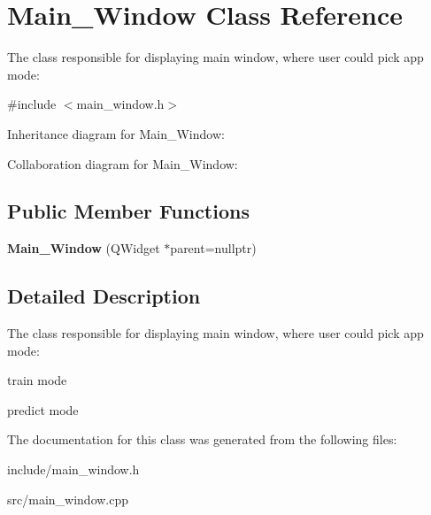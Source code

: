\hypertarget{classMain__Window}{}\section{Main\+\_\+\+Window Class Reference}
\label{classMain__Window}


The class responsible for displaying main window, where user could pick app mode\+:  




{\ttfamily \#include $<$main\+\_\+window.\+h$>$}



Inheritance diagram for Main\+\_\+\+Window\+:


Collaboration diagram for Main\+\_\+\+Window\+:
\subsection*{Public Member Functions}
\begin{DoxyCompactItemize}
\item 
\mbox{\label{classMain__Window_a74de7d059afe56907e349276d60910d1}} 
{\bfseries Main\+\_\+\+Window} (Q\+Widget $\ast$parent=nullptr)
\end{DoxyCompactItemize}


\subsection{Detailed Description}
The class responsible for displaying main window, where user could pick app mode\+: 


\begin{DoxyItemize}
\item train mode
\item predict mode 
\end{DoxyItemize}

The documentation for this class was generated from the following files\+:\begin{DoxyCompactItemize}
\item 
include/main\+\_\+window.\+h\item 
src/main\+\_\+window.\+cpp\end{DoxyCompactItemize}
